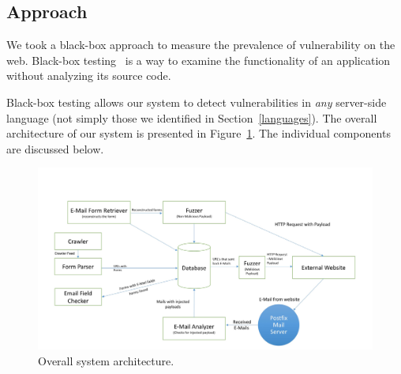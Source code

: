 \subsection{Approach}
\label{sys:appr}
We took a black-box approach to measure the prevalence of \ehi vulnerability on the web. Black-box testing~\cite{Beizer:1995:BTT:202699} is a way to examine the functionality of an application without analyzing its source code.

Black-box testing allows our system to detect \ehi vulnerabilities in \emph{any} server-side language (not simply those we identified in Section~\ref{languages}). The overall architecture of our system is presented in Figure~\ref{fig:overall}. The individual components are discussed below.

\begin{figure}
	\centering
	\includegraphics[width=.75\textwidth, height=.25\textheight]{overall}
	\caption{Overall system architecture.}
	\label{fig:overall}
\end{figure}
